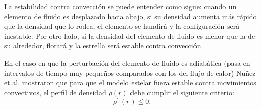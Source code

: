 La estabilidad contra convección se puede entender como sigue: cuando un elemento de fluido es desplazado hacia abajo, si su densidad aumenta más rápido que la densidad que lo rodea, el elemento se hundirá y la configuraci\'on será inestable. Por otro lado, si la densidad del elemento de fluido es menor que la de su alrededor, flotará y la estrella será estable contra convección.

En el caso en que la perturbación del elemento de fluido es adiabática (pasa en intervalos de tiempo muy pequeños comparados con los del flujo de calor) Nuñez et al. \cite{Hernandez2018} mostraron que para que el modelo estelar fuera estable contra movimientos convectivos, el perfil de densidad $\rho(r)$ debe cumplir el siguiente criterio: 
\begin{equation}
    \rho ^ { \prime \prime } ( r ) \leq 0.
\end{equation}
